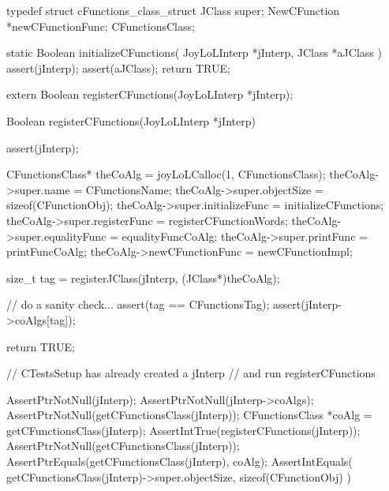 \startTestSuite[registerCFunctions]

\startCHeader
typedef struct cFunctions_class_struct {
  JClass    super;
  NewCFunction *newCFunctionFunc;
} CFunctionsClass;
\stopCHeader

\startCCode
static Boolean initializeCFunctions(
  JoyLoLInterp *jInterp,
  JClass   *aJClass
) {
  assert(jInterp);
  assert(aJClass);
  return TRUE;
}
\stopCCode

\startCHeader
extern Boolean registerCFunctions(JoyLoLInterp *jInterp);
\stopCHeader
{}

\startCCode
Boolean registerCFunctions(JoyLoLInterp *jInterp) {
  assert(jInterp);
  
  CFunctionsClass* theCoAlg    =
    joyLoLCalloc(1, CFunctionsClass);
  theCoAlg->super.name           = CFunctionsName;
  theCoAlg->super.objectSize     = sizeof(CFunctionObj);
  theCoAlg->super.initializeFunc = initializeCFunctions;
  theCoAlg->super.registerFunc   = registerCFunctionWords;
  theCoAlg->super.equalityFunc   = equalityFuncCoAlg;
  theCoAlg->super.printFunc      = printFuncCoAlg;
  theCoAlg->newCFunctionFunc     = newCFunctionImpl;
  
  size_t tag =
    registerJClass(jInterp, (JClass*)theCoAlg);

  // do a sanity check...
  assert(tag == CFunctionsTag);
  assert(jInterp->coAlgs[tag]);

  return TRUE;
}
\stopCCode


\startCTest
  // CTestsSetup has already created a jInterp
  // and run registerCFunctions
  
  AssertPtrNotNull(jInterp);
  AssertPtrNotNull(jInterp->coAlgs);
  AssertPtrNotNull(getCFunctionsClass(jInterp));
  CFunctionsClass *coAlg =
    getCFunctionsClass(jInterp);
  AssertIntTrue(registerCFunctions(jInterp));
  AssertPtrNotNull(getCFunctionsClass(jInterp));
  AssertPtrEquals(getCFunctionsClass(jInterp), coAlg);
  AssertIntEquals(
    getCFunctionsClass(jInterp)->super.objectSize,
    sizeof(CFunctionObj)
  )
\stopCTest
\stopTestCase
\stopTestSuite
